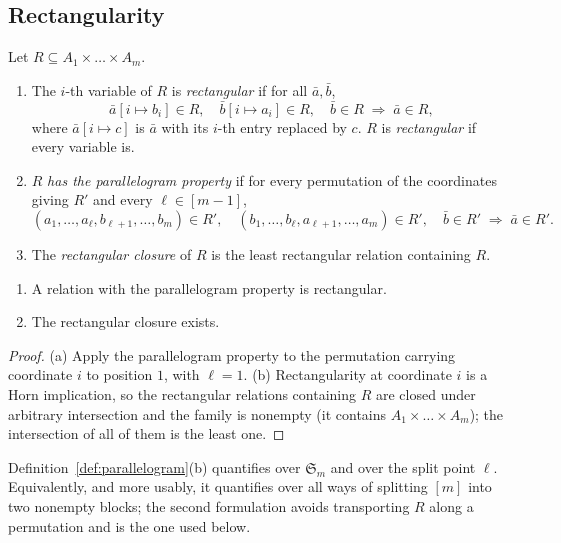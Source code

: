 \subsection{Rectangularity}

\begin{definition}\label{def:parallelogram}
Let $R\subseteq A_{1}\times\dots\times A_{m}$.
\begin{enumerate}\alphlabels\tightlist
\item The $i$-th variable of $R$ is \emph{rectangular} if for all
  $\bar a,\bar b$,
  \[
    \bar a[i\mapsto b_{i}]\in R,\quad
    \bar b[i\mapsto a_{i}]\in R,\quad
    \bar b\in R
    \;\Longrightarrow\;\bar a\in R,
  \]
  where $\bar a[i\mapsto c]$ is $\bar a$ with its $i$-th entry replaced by $c$.
  $R$ is \emph{rectangular} if every variable is.
\item $R$ \emph{has the parallelogram property} if for every permutation of the
  coordinates giving $R'$ and every $\ell\in[m-1]$,
  \[
    (a_{1},\dots,a_{\ell},b_{\ell+1},\dots,b_{m})\in R',\quad
    (b_{1},\dots,b_{\ell},a_{\ell+1},\dots,a_{m})\in R',\quad
    \bar b\in R'
    \;\Longrightarrow\;\bar a\in R'.
  \]
\item The \emph{rectangular closure} of $R$ is the least rectangular relation
  containing $R$.
\end{enumerate}
\end{definition}

\begin{lemma}\label{lem:rect-basics}
\begin{enumerate}\alphlabels\tightlist
\item A relation with the parallelogram property is rectangular.
\item The rectangular closure exists.
\end{enumerate}
\end{lemma}

\begin{proof}
(a) Apply the parallelogram property to the permutation carrying coordinate
$i$ to position $1$, with $\ell=1$. (b) Rectangularity at coordinate $i$ is a
Horn implication, so the rectangular relations containing $R$ are closed under
arbitrary intersection and the family is nonempty (it contains
$A_{1}\times\dots\times A_{m}$); the intersection of all of them is the least
one.
\end{proof}

\begin{hazard}\label{haz:permutations}
Definition~\ref{def:parallelogram}(b) quantifies over $\mathfrak S_{m}$ and
over the split point $\ell$. Equivalently, and more usably, it quantifies over
all ways of splitting $[m]$ into two nonempty blocks; the second formulation
avoids transporting $R$ along a permutation and is the one used below.
\end{hazard}

